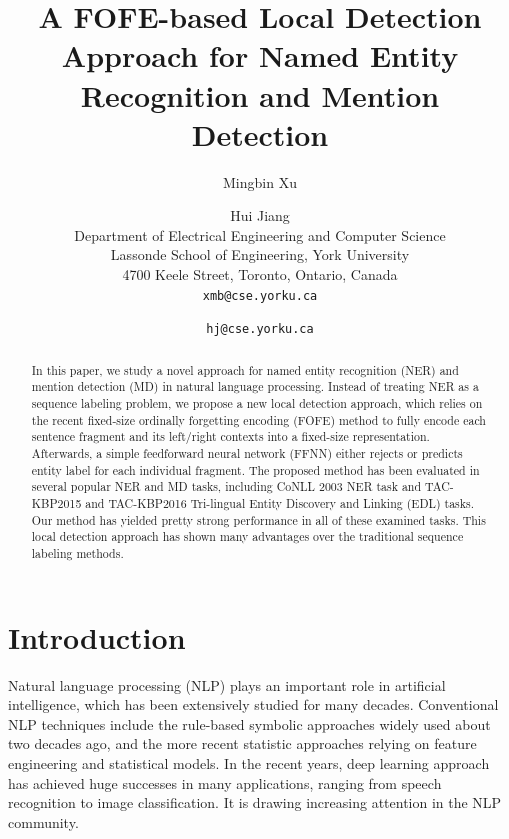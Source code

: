 \documentclass[11pt,a4paper]{article}
\title{A FOFE-based Local Detection Approach for Named Entity Recognition and Mention Detection}
\author{Mingbin Xu \and Hui Jiang \\
	Department of Electrical Engineering and Computer Science \\
	Lassonde School of Engineering, York University \\
	4700 Keele Street, Toronto, Ontario, Canada\\
	{\tt xmb@cse.yorku.ca} \and  {\tt hj@cse.yorku.ca}
}
\date{}
\begin{document}
\maketitle


\begin{abstract}
	In this paper, we study a novel approach for named entity recognition (NER) and mention detection (MD) in natural language processing. Instead of treating NER as a sequence labeling problem, we propose a new local detection approach, which relies on the recent fixed-size ordinally forgetting encoding (FOFE) method to fully encode each sentence fragment and its left/right contexts into a fixed-size representation. Afterwards, a simple feedforward neural network (FFNN) either rejects or predicts entity label for each individual fragment. The proposed method has been evaluated in several popular NER and MD tasks, including CoNLL 2003 NER task and  TAC-KBP2015 and TAC-KBP2016 Tri-lingual Entity Discovery and Linking (EDL) tasks. Our method has yielded pretty strong performance in all of these examined tasks. This local detection approach has shown many advantages over the traditional sequence labeling  methods.
\end{abstract}


\section{Introduction}

Natural language processing (NLP) plays an important role in artificial intelligence, which has been extensively studied for many decades. Conventional NLP techniques include the rule-based symbolic approaches widely used about two decades ago, and the more recent statistic approaches relying on feature engineering and statistical models. In the recent years, deep learning approach has achieved huge successes in many applications, ranging from speech recognition to image classification. It is drawing increasing attention in the NLP community. 
\end{document}

